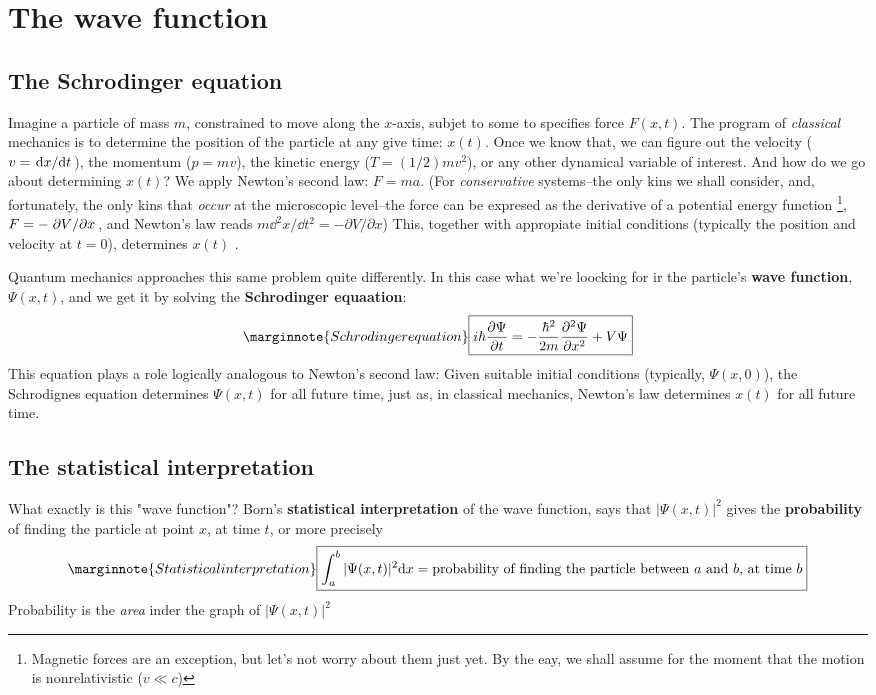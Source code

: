 \chapter{The wave function}
\section{The Schrodinger equation}
Imagine a particle of mass $m$, constrained to move along the $x$-axis, subjet to some to specifies force $F(x,t)$. The program of \textit{classical} mechanics is to determine the position of the particle at any give time: $x(t)$. Once we know that, we can figure out the velocity ($v=\dv*{x}{t}$), the momentum ($p=mv$), the kinetic energy ($T=(1/2)mv^2$), or any other dynamical variable of interest. And how do we go about determining $x(t)$? We apply Newton's second law: $F=ma$. (For \textit{conservative} systems--the only kins we shall consider, and, fortunately, the only kins that \textit{occur} at the microscopic level--the force can be expresed as the derivative of a potential energy function \footnote{Magnetic forces are an exception, but let's not worry about them just yet. By the eay, we shall assume for the moment that the motion is nonrelativistic ($v\ll c$)}, $F=-\pdv*{V}{x}$, and Newton's law reads $m\dd ^2x/\dd t^2=-\partial V/\partial x$) This, together with appropiate initial conditions (typically the position and velocity at $t=0$), determines $x(t)$ .

Quantum mechanics approaches this same problem quite differently. In this case what we're loocking for ir the particle's \textbf{wave function}, $\Psi(x,t)$, and we get it by solving the \textbf{Schrodinger equaation}:
\begin{equation}\label{1.1}\marginnote{Schrodinger equation}
	\boxed{i\hbar\pdv{\Psi}{t}=-\frac{\hbar^2}{2m}\pdv[2]{\Psi}{x}+V\Psi}
\end{equation}
This equation plays a role logically analogous to Newton's second law: Given suitable initial conditions (typically, $\Psi(x,0)$), the Schrodignes equation determines $\Psi(x,t)$ for all future time, just as, in classical mechanics, Newton's law determines $x(t)$ for all future time.

\section{The statistical interpretation}
What exactly is this "wave function"? Born's \textbf{statistical interpretation} of the wave function, says that $|\Psi(x,t)|^2 $ gives the \textbf{probability} of finding the particle at point $x$, at time $t$, or more precisely
\begin{equation}\label{1.3}\marginnote{Statistical interpretation}
	\boxed{\int_a^b|\Psi(x,t)|^2\dd x=\mbox{probability of finding the particle  between $a$ and $b$, at time $b$}}
\end{equation}
Probability is the \textit{area} inder the graph of $|\Psi(x,t)|^2$

